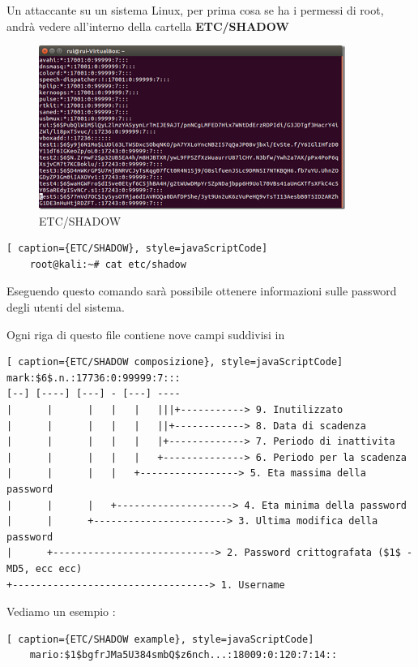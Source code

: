 Un attaccante su un sistema Linux\cite{hash_Linux}, per prima cosa se ha i permessi di root, andrà vedere all'interno della cartella \textbf{ETC/SHADOW}

\begin{figure}[h!]
    \centering
    \includegraphics[width=100mm]{Immagini/2/linux_1.png}
    \caption{ETC/SHADOW}
    \label{fig:ProcDump}
\end{figure}

\begin{lstlisting}[ caption={ETC/SHADOW}, style=javaScriptCode]
    root@kali:~# cat etc/shadow
\end{lstlisting}

Eseguendo questo comando sarà possibile ottenere informazioni sulle password degli utenti del sistema.

Ogni riga di questo file contiene nove campi suddivisi in 

\begin{lstlisting}[ caption={ETC/SHADOW composizione}, style=javaScriptCode]
mark:$6$.n.:17736:0:99999:7:::
[--] [----] [---] - [---] ----
|      |      |   |   |   |||+-----------> 9. Inutilizzato
|      |      |   |   |   ||+------------> 8. Data di scadenza
|      |      |   |   |   |+-------------> 7. Periodo di inattivita
|      |      |   |   |   +--------------> 6. Periodo per la scadenza
|      |      |   |   +-----------------> 5. Eta massima della password
|      |      |   +--------------------> 4. Eta minima della password
|      |      +-----------------------> 3. Ultima modifica della password
|      +----------------------------> 2. Password crittografata ($1$ -MD5, ecc ecc)
+----------------------------------> 1. Username
\end{lstlisting}

Vediamo un esempio :

\begin{lstlisting}[ caption={ETC/SHADOW example}, style=javaScriptCode]
    mario:$1$bgfrJMa5U384smbQ$z6nch...:18009:0:120:7:14::
\end{lstlisting}

